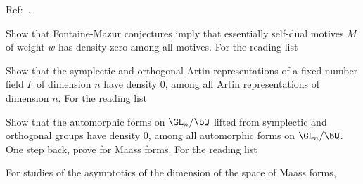 \documentclass[0-main]{subfiles}
\begin{document}
\ifSubfilesClassLoaded{
	\tableofcontents
}{}


Ref:~\cite{Rohrlich2013}.

\begin{enr}
	\item Show that Fontaine-Mazur conjectures imply that essentially self-dual motives $M$ of weight $w$ has density zero among all motives. For the reading list
	\begin{enr}
		\item \cite{FM1995,Emerton2006,Kisin2009FontaineMazur}
	\end{enr}
	\item Show that the symplectic and orthogonal Artin representations of a fixed number field $F$ of dimension $n$ have density $0$, among all Artin representations of dimension $n$. For the reading list
	\begin{enr}
		\item \cite{Rohrlich2013,Karnataki2017}
		\item \cite{Malle2002,Malle2004,Kluners2005,Turkelli2015}
		\item \cite{ASVW2021,CDO2002,Zagier1997}
	\end{enr}
	\item Show that the automorphic forms on $\GL_{n}/\bQ$ lifted from symplectic and orthogonal groups have density $0$, among all automorphic forms on $\GL_{n}/\bQ$. One step back, prove for Maass forms. For the reading list
	\begin{enr}
		\item \cite{Iwaniec1997,Bump1997}
		\item \cite{Kala2014,BLS2020}
	\end{enr}
	For studies of the asymptotics of the dimension of the space of Maass forms,
	\begin{enr}
		\item \cite{LV2007,Muller2007,FLM2015,MT2021}
	\end{enr}
\end{enr}




\end{document}
